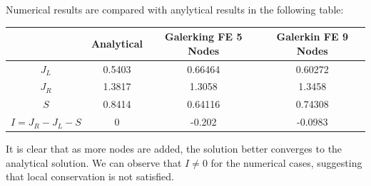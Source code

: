 \documentclass[11pt]{article}
\begin{document}
Numerical results are compared with anylytical results in the following table:\\

\begin{center}
\begin{tabular}{|c|c|c|c|}
\hline
 & \textbf{Analytical} & \textbf{Galerking FE 5 Nodes} & \textbf{Galerkin FE 9 Nodes}\\
\hline
$J_{L}$ & 0.5403 & 0.66464 & 0.60272\\
$J_{R}$ & 1.3817 & 1.3058 & 1.3458\\
$S$ & 0.8414 & 0.64116 & 0.74308\\
$I= J_{R}-J_{L}-S$ & 0 & -0.202 & -0.0983\\
\hline
\end{tabular}
\end{center}
It is clear that as more nodes are added, the solution better converges to the analytical solution.
We can observe that $I \neq 0$ for the numerical cases, suggesting that local conservation is not satisfied.    


\newpage
\end{document}
